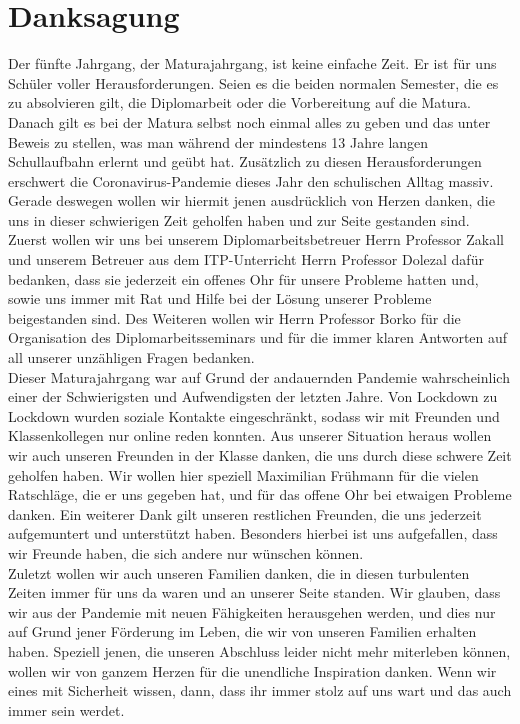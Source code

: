 \chapter{Danksagung} 
Der fünfte Jahrgang, der Maturajahrgang, ist keine einfache Zeit. Er ist für uns Schüler voller Herausforderungen. Seien es die beiden normalen Semester, die es zu absolvieren gilt, die Diplomarbeit oder die Vorbereitung auf die Matura. Danach gilt es bei der Matura selbst noch einmal alles zu geben und das unter Beweis zu stellen, was man während der mindestens 13 Jahre langen Schullaufbahn erlernt und geübt hat. Zusätzlich zu diesen Herausforderungen erschwert die Coronavirus-Pandemie dieses Jahr den schulischen Alltag massiv. Gerade deswegen wollen wir hiermit jenen ausdrücklich von Herzen danken, die uns in dieser schwierigen Zeit geholfen haben und zur Seite gestanden sind.\\

Zuerst wollen wir uns bei unserem Diplomarbeitsbetreuer Herrn Professor Zakall und unserem Betreuer aus dem ITP-Unterricht Herrn Professor Dolezal dafür bedanken, dass sie jederzeit ein offenes Ohr für unsere Probleme hatten und, sowie uns immer mit Rat und Hilfe bei der Lösung unserer Probleme beigestanden sind. Des Weiteren wollen wir Herrn Professor Borko für die Organisation des Diplomarbeitsseminars und für die immer klaren Antworten auf all unserer unzähligen Fragen bedanken.\\

Dieser Maturajahrgang war auf Grund der andauernden Pandemie wahrscheinlich einer der Schwierigsten und Aufwendigsten der letzten Jahre. Von Lockdown zu Lockdown wurden soziale Kontakte eingeschränkt, sodass wir mit Freunden und Klassenkollegen nur online reden konnten. Aus unserer Situation heraus wollen wir auch unseren Freunden in der Klasse danken, die uns durch diese schwere Zeit geholfen haben. Wir wollen hier speziell Maximilian Frühmann für die vielen Ratschläge, die er uns gegeben hat, und für das offene Ohr bei etwaigen Probleme danken. Ein weiterer Dank gilt unseren restlichen Freunden, die uns jederzeit aufgemuntert und unterstützt haben. Besonders hierbei ist uns aufgefallen, dass wir Freunde haben, die sich andere nur wünschen können.\\

Zuletzt wollen wir auch unseren Familien danken, die in diesen turbulenten Zeiten immer für uns da waren und an unserer Seite standen. Wir glauben, dass wir aus der Pandemie mit neuen Fähigkeiten herausgehen werden, und dies nur auf Grund jener Förderung im Leben, die wir von unseren Familien erhalten haben. 
Speziell jenen, die unseren Abschluss leider nicht mehr miterleben können, wollen wir von ganzem Herzen für die unendliche Inspiration danken. Wenn wir eines mit Sicherheit wissen, dann, dass ihr immer stolz auf uns wart und das auch immer sein werdet.